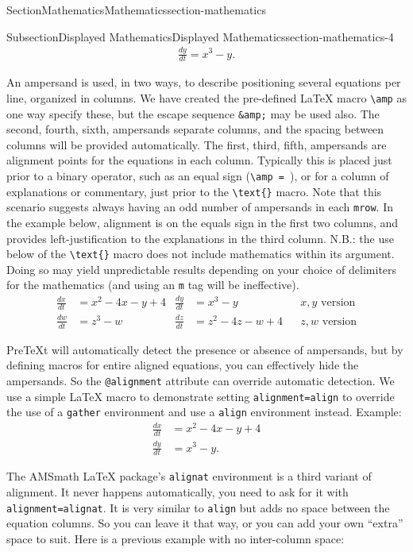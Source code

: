 \documentclass[twoside,10pt,]{article}
\newcommand{\mono}[1]{\texttt{#1}}
\numberwithin{equation}{section}
\newcommand{\myequation}[2]{#1\amp =#2}
\newcommand{\amp}{&}
\begin{document}
\begin{sectionptx}{Section}{Mathematics}{}{Mathematics}{}{}{section-mathematics}
\begin{subsectionptx}{Subsection}{Displayed Mathematics}{}{Displayed Mathematics}{}{}{section-mathematics-4}
\begin{gather*}
\frac{dy}{dt} = x^3 - y.
\end{gather*}
%
\par
An ampersand is used, in two ways, to describe positioning several equations per line, organized in columns.  We have created the pre-defined \LaTeX{} macro \mono{\textbackslash{}amp} as one way specify these, but the escape sequence \mono{\&amp;} may be used also.  The second, fourth, sixth, \textellipsis{} ampersands separate columns, and the spacing between columns will be provided automatically.  The first, third, fifth, \textellipsis{} ampersands are alignment points for the equations in each column.  Typically this is placed just prior to a binary operator, such as an equal sign (\mono{\textbackslash{}amp = }), or for a column of explanations or commentary, just prior to the \mono{\textbackslash{}text\{\}} macro.  Note that this scenario suggests always having an odd number of ampersands in each \mono{mrow}.  In the example below, alignment is on the equals sign in the first two columns, and provides left-justification to the explanations in the third column.  N.B.: the use below of the \mono{\textbackslash{}text\{\}} macro does not include mathematics within its argument.  Doing so may yield unpredictable results depending on your choice of delimiters for the mathematics (and using an \mono{m} tag will be ineffective).%
\begin{align*}
\frac{dx}{dt} \amp = x^2 - 4x - y + 4 \amp \frac{dy}{dt} \amp = x^3 - y          \amp\amp x, y\text{ version}\\
\frac{dw}{dt} \amp = z^3 - w          \amp \frac{dz}{dt} \amp = z^2 - 4z - w + 4 \amp\amp z, w\text{ version}
\end{align*}
%
\par
PreTeXt will automatically detect the presence or absence of ampersands, but by defining macros for entire aligned equations, you can effectively hide the ampersands.  So the \mono{@alignment} attribute can override automatic detection.  We use a simple \LaTeX{} macro to demonstrate setting \mono{alignment=\textquotesingle{}align\textquotesingle{}} to override the use of a \mono{gather} environment and use a \mono{align} environment instead.  Example:%
\begin{align*}
\myequation{\frac{dx}{dt}}{x^2 - 4x - y + 4}\\
\myequation{\frac{dy}{dt}}{x^3 - y}.
\end{align*}
%
\par
The AMSmath \LaTeX{} package's \mono{alignat} environment is a third variant of alignment.  It never happens automatically, you need to ask for it with \mono{alignment=\textquotedbl{}alignat\textquotedbl{}}.  It is very similar to \mono{align} but adds no space between the equation columns.  So you can leave it that way, or you can add your own ``extra'' space to suit.  Here is a previous example with no inter-column space:%

\end{subsectionptx}
\end{sectionptx}
\end{document}
